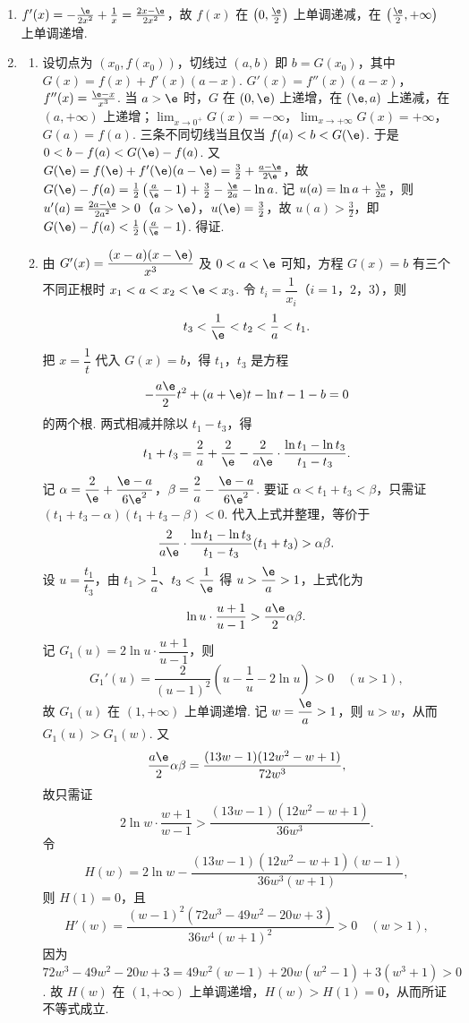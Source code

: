 \begin{solution}
\begin{enumerate}
\item \(f'(x)=-\frac{\e}{2x^2}+\frac1x=\frac{2x-\e}{2x^2}\)，故 \(f(x)\) 在 \(\left(0,\frac\e2\right)\) 上单调递减，在 \(\left(\frac\e2,+\infty\right)\) 上单调递增.
\item
\begin{enumerate}
\item 设切点为 \((x_0,f(x_0))\)，切线过 \((a,b)\) 即 \(b=G(x_0)\)，其中 \(G(x)=f(x)+f'(x)(a-x)\). \(G'(x)=f''(x)(a-x)\)，\(f''(x)=\frac{\e-x}{x^3}\). 当 \(a>\e\) 时，\(G\) 在 \((0,\e)\) 上递增，在 \((\e,a)\) 上递减，在 \((a,+\infty)\) 上递增；\(\lim_{x\to0^+}G(x)=-\infty\)，\(\lim_{x\to+\infty}G(x)=+\infty\)，\(G(a)=f(a)\). 三条不同切线当且仅当 \(f(a)<b<G(\e)\). 于是 \(0<b-f(a)<G(\e)-f(a)\). 又 \(G(\e)=f(\e)+f'(\e)(a-\e)=\frac32+\frac{a-\e}{2\e}\)，故 \(G(\e)-f(a)=\frac12\left(\frac a\e-1\right)+\frac32-\frac{\e}{2a}-\ln a\). 记 \(u(a)=\ln a+\frac{\e}{2a}\)，则 \(u'(a)=\frac{2a-\e}{2a^2}>0\)（\(a>\e\)），\(u(\e)=\frac32\)，故 \(u(a)>\frac32\)，即 \(G(\e)-f(a)<\frac12\left(\frac a\e-1\right)\). 得证.
\item 由 \(G'(x)=\dfrac{(x-a)(x-\e)}{x^3}\) 及 \(0<a<\e\) 可知，方程 \(G(x)=b\) 有三个不同正根时 \(x_1<a<x_2<\e<x_3\). 令 \(t_i=\dfrac1{x_i}\)（\(i=1\)，\(2\)，\(3\)），则
\[
t_3<\dfrac1\e<t_2<\dfrac1a<t_1.
\]
把 \(x=\dfrac1t\) 代入 \(G(x)=b\)，得 \(t_1\)，\(t_3\) 是方程
\[
-\dfrac{a\e}{2}t^2+(a+\e)t-\ln t-1-b=0
\]
的两个根. 两式相减并除以 \(t_1-t_3\)，得
\[
t_1+t_3=\dfrac2a+\dfrac2\e-\dfrac{2}{a\e}\cdot\dfrac{\ln t_1-\ln t_3}{t_1-t_3}.
\]
记 \(\alpha=\dfrac2\e+\dfrac{\e-a}{6\e^2}\)，\(\beta=\dfrac2a-\dfrac{\e-a}{6\e^2}\). 要证 \(\alpha<t_1+t_3<\beta\)，只需证 \((t_1+t_3-\alpha)(t_1+t_3-\beta)<0\). 代入上式并整理，等价于
\[
\dfrac{2}{a\e}\cdot\dfrac{\ln t_1-\ln t_3}{t_1-t_3}(t_1+t_3)>\alpha\beta.
\]
设 \(u=\dfrac{t_1}{t_3}\)，由 \(t_1>\dfrac1a\)、\(t_3<\dfrac1\e\) 得 \(u>\dfrac\e a>1\)，上式化为
\[
\ln u\cdot\dfrac{u+1}{u-1}>\dfrac{a\e}{2}\alpha\beta.
\]
记 \(G_1(u)=2\ln u\cdot\dfrac{u+1}{u-1}\)，则
\[
G_1'(u)=\dfrac{2}{(u-1)^2}\left(u-\dfrac1u-2\ln u\right)>0\quad(u>1),
\]
故 \(G_1(u)\) 在 \((1,+\infty)\) 上单调递增. 记 \(w=\dfrac\e a>1\)，则 \(u>w\)，从而 \(G_1(u)>G_1(w)\). 又
\[
\dfrac{a\e}{2}\alpha\beta=\dfrac{(13w-1)(12w^2-w+1)}{72w^3},
\]
故只需证
\[
2\ln w\cdot\dfrac{w+1}{w-1}>\dfrac{(13w-1)(12w^2-w+1)}{36w^3}.
\]
令
\[
H(w)=2\ln w-\dfrac{(13w-1)(12w^2-w+1)(w-1)}{36w^3(w+1)},
\]
则 \(H(1)=0\)，且
\[
H'(w)=\dfrac{(w-1)^2(72w^3-49w^2-20w+3)}{36w^4(w+1)^2}>0\quad(w>1),
\]
因为 \(72w^3-49w^2-20w+3=49w^2(w-1)+20w(w^2-1)+3(w^3+1)>0\). 故 \(H(w)\) 在 \((1,+\infty)\) 上单调递增，\(H(w)>H(1)=0\)，从而所证不等式成立.
\end{enumerate}
\end{enumerate}
\end{solution}
